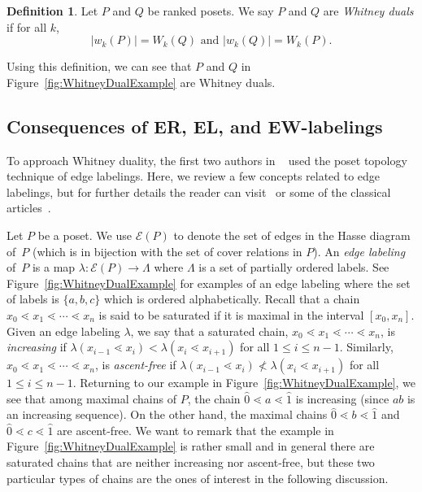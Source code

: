 \documentclass[11pt]{article}
\theoremstyle{definition}
\newtheorem{defi}[theo]{Definition}
\numberwithin{equation}{section}
\newcommand{\cover}{\lessdot}
\begin{document}
\begin{defi}
Let $P$ and $Q$ be ranked posets.  We say $P$ and $Q$ are  \emph{Whitney duals} if for all $k$,
$$
|w_k(P)| = W_k(Q) \mbox{ and }  |w_k(Q)| = W_k(P).
$$
\end{defi}

\noindent Using this definition, we can see that $P$ and $Q$ in Figure~\ref{fig:WhitneyDualExample} are Whitney duals.


\subsection{Consequences of ER, EL, and EW-labelings}

To approach Whitney duality, the first two authors in ~\cite{GonzalezHallam2021} used the poset topology technique of edge labelings.    Here, we review  a few concepts related to edge labelings, but for further details the reader can visit~\cite{Wachs2007,Stanley2012} or some of the classical articles~\cite{Stanley1974,Bjorner1980,BjornerWachs1983,BjornerWachs1996,BjornerWachs1997}.

Let $P$ be a poset. We use $\mathcal{E}(P)$ to denote the set of edges in the Hasse diagram of~$P$ (which is  in bijection with the set of cover relations in $P$).  An \emph{edge labeling} of~$P$ is a map $\lambda:  \mathcal{E}(P)\rightarrow \Lambda$ where $\Lambda$ is a set of partially ordered labels.    See Figure~\ref{fig:WhitneyDualExample} for   examples of an edge labeling where the set of labels is $\{a,b,c\}$ which is ordered alphabetically.  Recall that a chain $x_0\cover x_1\cover \cdots\cover x_n$ is said to be saturated if it is maximal in the interval $[x_0,x_n]$. Given an edge labeling $\lambda$, we say  that a saturated chain, $x_0\cover x_1\cover \cdots\cover x_n$,  is \emph{increasing} if $\lambda(x_{i-1}\cover x_{i}) < \lambda(x_{i}\cover x_{i+1})$ for all $1\leq i\leq n-1$.  Similarly, $x_0\cover x_1\cover \cdots\cover x_n$,  is \emph{ascent-free} if $\lambda(x_{i-1}\cover x_{i}) \not < \lambda(x_{i}\cover x_{i+1})$ for all $1\leq i\leq n-1$.  Returning to our example    in   Figure~\ref{fig:WhitneyDualExample}, we see that among maximal chains of $P$, the chain $\hat{0}\cover a\cover \hat{1}$ is increasing (since $ab$ is an increasing sequence).  On the other hand, the maximal chains $\hat{0}\cover b \cover \hat{1}$ and $\hat{0}\cover c\cover \hat{1}$ are ascent-free.  We want to remark that the example in  Figure~\ref{fig:WhitneyDualExample} is rather small and in general there are saturated chains that are neither increasing nor ascent-free, but these two particular types of chains are the ones of interest in the following discussion.
\end{document}
